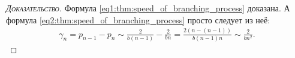 \documentclass[../main.tex]{subfiles}
\begin{document}
\begin{proof}[\normalfont\textsc{Доказательство}]
  Формула \eqref{eq1:thm:speed_of_branching_process} доказана. А формула \eqref{eq2:thm:speed_of_branching_process} просто следует из неё:
  \begin{align*}
   \gamma_n = p_{n-1} - p_{n} \sim \frac{2}{b(n-1)} - \frac{2}{bn} = \frac{2(n - (n-1))}{b(n-1)n} \sim \frac{2}{bn^{2}}.
  \end{align*}
 \end{proof}

 
\end{document}
